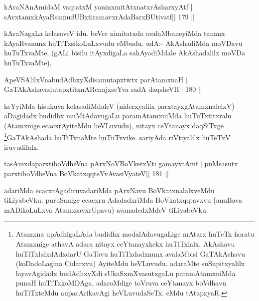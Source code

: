 \begin{shl}
kAraNAnAmidaM vaqtatxM yaninxmitAtxnatxrAsharxyAtf |
sAvxtamxkAyaRsamudUBxtiramavxrAdaBarxBUtivatf\hfill || 179 ||
\end{shl}

\begin{artha}
kAraNagaLa kelasaveV idu. beVre nimitatxda avalaMbaneyiMda tananx  kAyaRvanunx huTiTxsikoLuLxvudu eMbudu. udA:- AkAshadiMda moVDavu  huTuTxvaMte, (gALi bisilu itAyxdigaLa sahAyadiMdale AkAshadalilx moVDa huTuTxvaMte).
\end{artha}


\begin{shl}
ApeVSAlilxVnabudAdhxyXdisamutapxtwtx parAtamxnaH |
GaTAkAshavadutapxtitxnARcnajxseYva sadA daqsheVH\hfill || 180 ||
\end{shl}

\begin{artha}
keYyiMda hisukuva kelasadiMdaleV (niderxyalilx parxtayxgAtamxnalelxV) 
aDagidadx budidhx muMtAdavugaLu paramAtamxniMda huTuTxtitxralu 
(Atamxnige ecacxrAyiteMdu heVLuvudu), nitayx ceYtanayx daqSiTxge 
\footnote[13]{Atamxna upAdhigaLAda budidhx modalAdavugaLige mAtarx 
huTeTx horatu Atamxnige athavA adara nitayx ceYtanayxkekx huTiTxlalx. 
AkAshavu huTiTxlalxdAdxdarU GaTavu huTiTxdadxnunx avalaMbisi 
GaTAkAshavu (koDadoLagina Cidarxvu) AyiteMdu heVLuvudu. adaraMte suSupitxyalilx layavAgidadx budAdhxyXdi sUkaSxmXvasutxgaLu paramAtamxniMda punaH huTiTxkoMDAga, adaroMdige toVruva ceYtanayx boVdhavu huTiTxteMdu aupacArikavAgi heVLuvudaSeTx. eMdu tAtapxyaR.}GaTAkAshada huTiTxnaMte huTuTxvike. sariyAda riVtiyalilx huTeTxV iruvudilalx.
\end{artha}


\begin{shl}
tasAmxdaparxtiboVdheVna pArxNoV\s BoVketxVti gamayxtAmf |
puMsasutx parxtiboVdheVna BoVkatxqqteYvAvasiVyateV\hfill || 181 ||
\end{shl}

\begin{artha}
adariMda ecacxrAgadiruvadariMda pArxNavu BoVkatxnalalxveMdu tiLiyabeVku. puruSanige ecacxru AdadadxriMda BoVkatxqqtavxvu (anuBava mADikoLuLxva AtamxsavxrUpavu) avanadedxMdeV tiLiyabeVku.
\end{artha}

